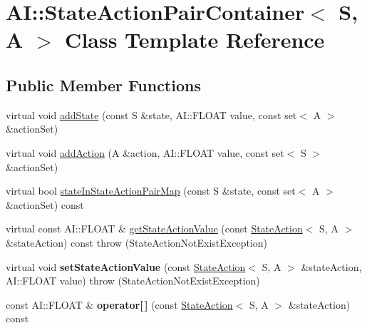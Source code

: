 \hypertarget{classAI_1_1StateActionPairContainer}{\section{A\-I\-:\-:State\-Action\-Pair\-Container$<$ S, A $>$ Class Template Reference}
\label{classAI_1_1StateActionPairContainer}
}
\subsection*{Public Member Functions}
\begin{DoxyCompactItemize}
\item 
virtual void \hyperlink{classAI_1_1StateActionPairContainer_a12842518174d0af5fc89c7a86e766099}{add\-State} (const S \&state, A\-I\-::\-F\-L\-O\-A\-T value, const set$<$ A $>$ \&action\-Set)
\item 
virtual void \hyperlink{classAI_1_1StateActionPairContainer_af4c9faef1c7d4e35b11f95b8a84352ae}{add\-Action} (A \&action, A\-I\-::\-F\-L\-O\-A\-T value, const set$<$ S $>$ \&action\-Set)
\item 
virtual bool \hyperlink{classAI_1_1StateActionPairContainer_a4da559c1dafe0c368a331c47aede0490}{state\-In\-State\-Action\-Pair\-Map} (const S \&state, const set$<$ A $>$ \&action\-Set) const 
\item 
virtual const A\-I\-::\-F\-L\-O\-A\-T \& \hyperlink{classAI_1_1StateActionPairContainer_aa3dccc9c82a2ec4130050c832e3da6c9}{get\-State\-Action\-Value} (const \hyperlink{classAI_1_1StateAction}{State\-Action}$<$ S, A $>$ \&state\-Action) const   throw (\-State\-Action\-Not\-Exist\-Exception)
\item 
\hypertarget{classAI_1_1StateActionPairContainer_a26fa5b9fd043865695e6c4adf97188d5}{virtual void {\bfseries set\-State\-Action\-Value} (const \hyperlink{classAI_1_1StateAction}{State\-Action}$<$ S, A $>$ \&state\-Action, A\-I\-::\-F\-L\-O\-A\-T value)  throw (\-State\-Action\-Not\-Exist\-Exception)}\label{classAI_1_1StateActionPairContainer_a26fa5b9fd043865695e6c4adf97188d5}

\item 
\hypertarget{classAI_1_1StateActionPairContainer_a4dc529e9a2fa432e93fe4e4d083fce6e}{const A\-I\-::\-F\-L\-O\-A\-T \& {\bfseries operator\mbox{[}$\,$\mbox{]}} (const \hyperlink{classAI_1_1StateAction}{State\-Action}$<$ S, A $>$ \&state\-Action) const }\label{classAI_1_1StateActionPairContainer_a4dc529e9a2fa432e93fe4e4d083fce6e}


\end{DoxyCompactItemize}
